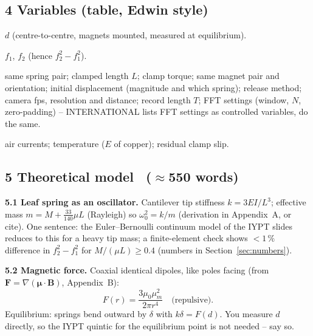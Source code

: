 \documentclass[11pt,a4paper]{article}
\newcommand{\muz}{\mu_0}
\newcommand{\mum}{\mu_m}
\newcommand{\words}[1]{~{\small\color{gray}($\approx$#1 words)}}
\begin{document}
\subsection*{4 Variables (table, Edwin style)}
\begin{description}[leftmargin=2.6cm,style=sameline]
\item[Independent] $d$ (centre-to-centre, magnets mounted, measured at equilibrium).
\item[Dependent] $f_1$, $f_2$ (hence $f_2^2-f_1^2$).
\item[Controlled] same spring pair; clamped length $L$; clamp torque; same magnet pair and
orientation; initial displacement (magnitude and which spring); release method; camera
fps, resolution and distance; record length $T$; FFT settings (window, $N$,
zero-padding) -- INTERNATIONAL lists FFT settings as controlled variables, do the same.
\item[Uncontrolled] air currents; temperature ($E$ of copper); residual clamp slip.
\end{description}

\subsection*{5 Theoretical model \words{550}}
\textbf{5.1 Leaf spring as an oscillator.} Cantilever tip stiffness $k=3EI/L^3$;
effective mass $m=M+\tfrac{33}{140}\mu L$ (Rayleigh) so $\omega_0^2=k/m$
(derivation in Appendix~A, or cite). One sentence: the Euler--Bernoulli continuum model of
the IYPT slides reduces to this for a heavy tip mass; a finite-element check shows
$<1\,\%$ difference in $f_2^2-f_1^2$ for $M/(\mu L)\ge0.4$ (numbers in
Section~\ref{sec:numbers}).

\textbf{5.2 Magnetic force.} Coaxial identical dipoles, like poles facing
(from $\bm F=\nabla(\bm\mu\!\cdot\!\bm B)$, Appendix~B):
\begin{equation}
  F(r)=\frac{3\muz\mum^2}{2\pi r^4}\quad\text{(repulsive)} .
\end{equation}
Equilibrium: springs bend outward by $\delta$ with $k\delta=F(d)$. You measure $d$
directly, so the IYPT quintic for the equilibrium point is not needed -- say so.
\end{document}
